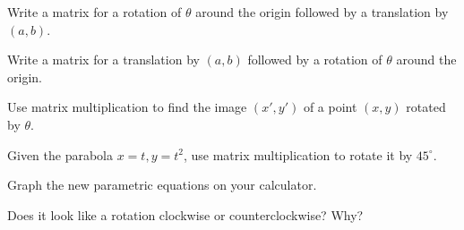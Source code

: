 \documentclass[../gatm_answers.tex]{subfiles}
\begin{document}
\begin{inner_problem}[start=1]
\item Write a matrix for a rotation of $\theta$ around the origin followed by a translation by $(a,b)$.
\end{inner_problem}

\begin{inner_problem}
\item Write a matrix for a translation by $(a,b)$ followed by a rotation of $\theta$ around the origin.
\end{inner_problem}

\begin{outer_problem}
\item Use matrix multiplication to find the image $(x',y')$ of a point $(x,y)$ rotated by $\theta$.
\end{outer_problem}

\begin{inner_problem}[start=1]
\item Given the parabola $x=t,y=t^2$, use matrix multiplication to rotate it by $45^\circ$.
\end{inner_problem}

\begin{inner_problem}
\item Graph the new parametric equations on your calculator.
\end{inner_problem}

\begin{inner_problem}
\item Does it look like a rotation clockwise or counterclockwise? Why?
\end{inner_problem}
\end{document}
